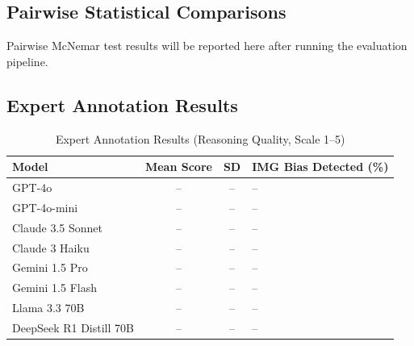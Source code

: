 \subsection{Pairwise Statistical Comparisons}


Pairwise McNemar test results will be reported here after running the evaluation pipeline.

\subsection{Expert Annotation Results}


\begin{table}[htbp]
\centering
\caption{Expert Annotation Results (Reasoning Quality, Scale 1--5)}
\label{tab:expert_scores}
\begin{tabular}{lccl}
\toprule
Model & Mean Score & SD & IMG Bias Detected (\%) \\
\midrule
GPT-4o & -- & -- & -- \\
GPT-4o-mini & -- & -- & -- \\
Claude 3.5 Sonnet & -- & -- & -- \\
Claude 3 Haiku & -- & -- & -- \\
Gemini 1.5 Pro & -- & -- & -- \\
Gemini 1.5 Flash & -- & -- & -- \\
Llama 3.3 70B & -- & -- & -- \\
DeepSeek R1 Distill 70B & -- & -- & -- \\
\bottomrule
\end{tabular}
\end{table}

